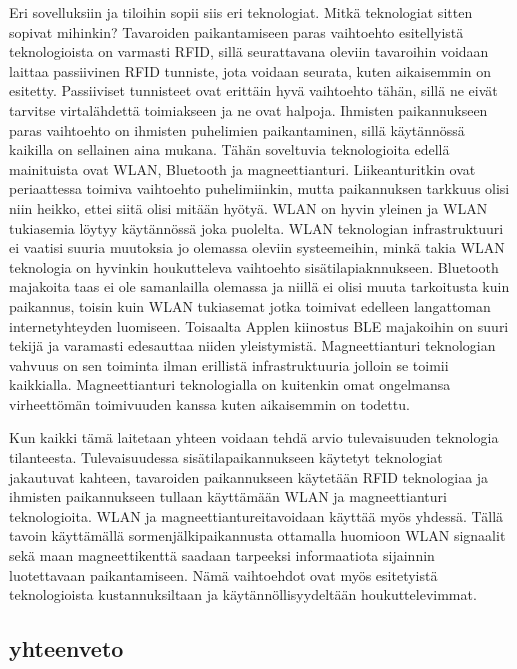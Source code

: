Eri sovelluksiin ja tiloihin sopii siis eri teknologiat. Mitkä teknologiat sitten sopivat mihinkin? Tavaroiden paikantamiseen paras vaihtoehto esitellyistä teknologioista on varmasti RFID, sillä seurattavana oleviin tavaroihin voidaan laittaa passiivinen RFID tunniste, jota voidaan seurata, kuten aikaisemmin on esitetty. Passiiviset tunnisteet ovat erittäin hyvä vaihtoehto tähän, sillä ne eivät tarvitse virtalähdettä toimiakseen ja ne ovat halpoja\cite{F}.  Ihmisten paikannukseen paras vaihtoehto on ihmisten puhelimien paikantaminen, sillä käytännössä kaikilla on sellainen aina mukana. Tähän soveltuvia teknologioita edellä mainituista ovat WLAN, Bluetooth ja magneettianturi. Liikeanturitkin ovat periaattessa toimiva vaihtoehto puhelimiinkin, mutta paikannuksen tarkkuus olisi niin heikko, ettei siitä olisi mitään hyötyä. WLAN on hyvin yleinen ja WLAN tukiasemia löytyy käytännössä joka puolelta. WLAN teknologian infrastruktuuri ei vaatisi suuria muutoksia jo olemassa oleviin systeemeihin, minkä takia WLAN teknologia on hyvinkin houkutteleva vaihtoehto sisätilapiaknnukseen. Bluetooth majakoita taas ei ole samanlailla olemassa ja niillä ei olisi muuta tarkoitusta kuin paikannus, toisin kuin WLAN tukiasemat jotka toimivat edelleen langattoman internetyhteyden luomiseen. Toisaalta Applen kiinostus BLE majakoihin on suuri tekijä ja varamasti edesauttaa niiden yleistymistä.  Magneettianturi teknologian vahvuus on sen toiminta ilman erillistä infrastruktuuria jolloin se toimii kaikkialla. Magneettianturi teknologialla on kuitenkin omat ongelmansa virheettömän toimivuuden kanssa kuten aikaisemmin on todettu. 

Kun kaikki tämä laitetaan yhteen voidaan tehdä arvio tulevaisuuden teknologia tilanteesta. Tulevaisuudessa sisätilapaikannukseen käytetyt teknologiat jakautuvat kahteen, tavaroiden paikannukseen käytetään RFID teknologiaa ja ihmisten paikannukseen tullaan käyttämään WLAN ja magneettianturi teknologioita. WLAN ja magneettiantureitavoidaan käyttää myös yhdessä\cite{atlas}. Tällä tavoin käyttämällä sormenjälkipaikannusta ottamalla huomioon WLAN signaalit sekä maan magneettikenttä saadaan tarpeeksi informaatiota sijainnin luotettavaan paikantamiseen. Nämä vaihtoehdot ovat myös esitetyistä teknologioista kustannuksiltaan ja käytännöllisyydeltään houkuttelevimmat.
\subsection{yhteenveto}

